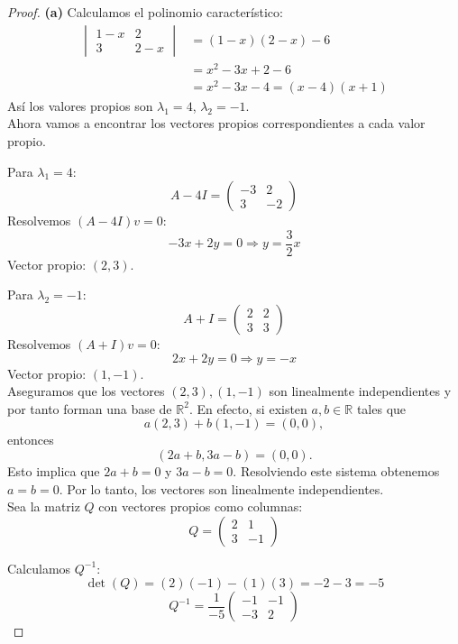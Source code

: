 \documentclass[11pt]{article}
\newcommand{\R}{\mathbb{R}}
\begin{document}
\begin{proof}
   \textbf{(a)} Calculamos el polinomio característico:
\begin{align*}
    \begin{vmatrix} 1-x& 2 \\ 3 & 2-x \end{vmatrix} &= (1-x)(2-x) - 6 \\
    &= x^2 - 3x + 2 - 6 \\ &= x^2 - 3x - 4=(x-4)(x+1)
\end{align*}
Así los valores propios son $\lambda_1 = 4$, $\lambda_2 = -1$. \\[10pt]
Ahora vamos a encontrar los vectores propios correspondientes a cada valor propio.

Para $\lambda_1 = 4$:
\[
A - 4I = \begin{pmatrix} -3 & 2 \\ 3 & -2 \end{pmatrix}
\]
Resolvemos $(A - 4I)v = 0$:
\[
-3x + 2y = 0 \Rightarrow y = \frac{3}{2}x
\]
Vector propio: $(2,3)$.

Para $\lambda_2 = -1$:
\[
A + I = \begin{pmatrix} 2 & 2 \\ 3 & 3 \end{pmatrix}
\]
Resolvemos $(A + I)v = 0$:
\[
2x + 2y = 0 \Rightarrow y = -x
\]
Vector propio: \((1,-1)\). \\ [10pt]
Aseguramos que los vectores $(2,3), (1,-1)$ son linealmente independientes y por tanto forman una base de $\R^2$. 
En efecto, si existen $a,b \in \R$ tales que
\[a(2,3) + b(1,-1) = (0,0),\] entonces 
\[(2a + b, 3a-b) = (0,0).\] 
Esto implica que \(2a + b = 0 \) y \( 3a - b =0 \). 
Resolviendo este sistema obtenemos $a=b=0$. Por lo tanto, los vectores son linealmente independientes. \\ [10pt]

Sea la matriz $Q$ con vectores propios como columnas: \[ Q = \begin{pmatrix} 2 & 1 \\ 3 & -1 \end{pmatrix} \]

Calculamos $Q^{-1}$:
\[
\det(Q) = (2)(-1) - (1)(3) = -2 - 3 = -5
\]
\[
Q^{-1} = \frac{1}{-5} \begin{pmatrix} -1 & -1 \\ -3 & 2 \end{pmatrix}
\]


\end{proof}
\end{document}
